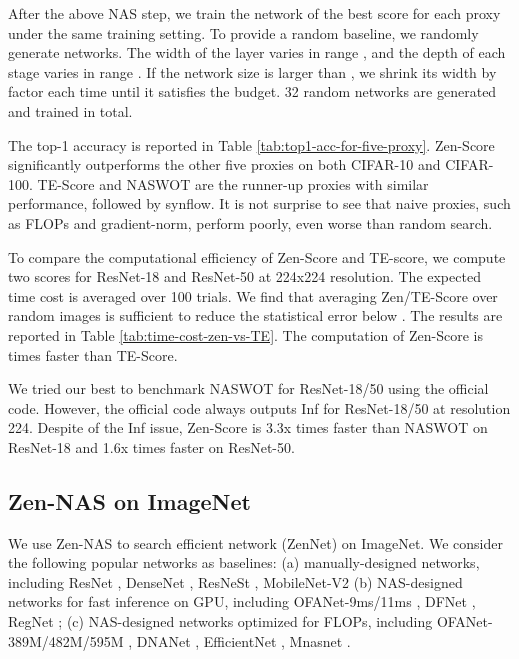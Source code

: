 \documentclass{article}
\providecommand{\citep}{\cite}
\begin{document}
After the above NAS step, we train the network of the best score for each proxy under the same training setting. To provide a random baseline, we randomly generate networks. The width of the layer varies in range , and the depth of each stage varies in range . If the network size is larger than , we shrink its width by factor  each time until it satisfies the budget. 32 random networks are generated and trained in total.

The top-1 accuracy is reported in Table \ref{tab:top1-acc-for-five-proxy}. Zen-Score significantly outperforms the other five proxies on both CIFAR-10 and CIFAR-100. TE-Score and NASWOT are the runner-up proxies with similar performance, followed by synflow. It is not surprise to see that naive proxies, such as FLOPs and gradient-norm, perform poorly, even worse than random search.

To compare the computational efficiency of Zen-Score and TE-score, we compute two scores for ResNet-18 and ResNet-50 at 224x224 resolution. The expected time cost is averaged over 100 trials. We find that averaging  Zen/TE-Score over  random images is sufficient to reduce the statistical error below . The results are reported in Table \ref{tab:time-cost-zen-vs-TE}. The computation of Zen-Score is  times faster than TE-Score. 

We tried our best to benchmark NASWOT for ResNet-18/50 using the official code. However, the official code always outputs Inf for ResNet-18/50 at resolution 224. Despite of the Inf issue, Zen-Score is 3.3x times faster than NASWOT on ResNet-18 and 1.6x times faster on ResNet-50.


\subsection{Zen-NAS on ImageNet}
\label{sec:Zen-NAS-on-ImageNet}

We use Zen-NAS to search efficient network (ZenNet) on ImageNet.  We consider the following popular networks as baselines: (a) manually-designed networks, including ResNet \citep{heDeepResidualLearning2016}, DenseNet \citep{huangDenselyConnectedConvolutional2017}, ResNeSt \citep{zhangResNeStSplitAttentionNetworks2020}, MobileNet-V2 \citep{sandlerMobileNetV2InvertedResiduals2018}  (b) NAS-designed networks for fast inference on GPU, including OFANet-9ms/11ms \citep{caiOnceforAllTrainOne2020}, DFNet \citep{liPartialOrderPruning2019}, RegNet \citep{radosavovicDesigningNetworkDesign2020}; (c) NAS-designed networks optimized for FLOPs, including OFANet-389M/482M/595M \citep{caiOnceforAllTrainOne2020}, DNANet \citep{liBlockwiselySupervisedNeural2020}, EfficientNet \citep{tanEfficientNetRethinkingModel2019}, Mnasnet \citep{tan_mnasnet:_2019}.
\end{document}
